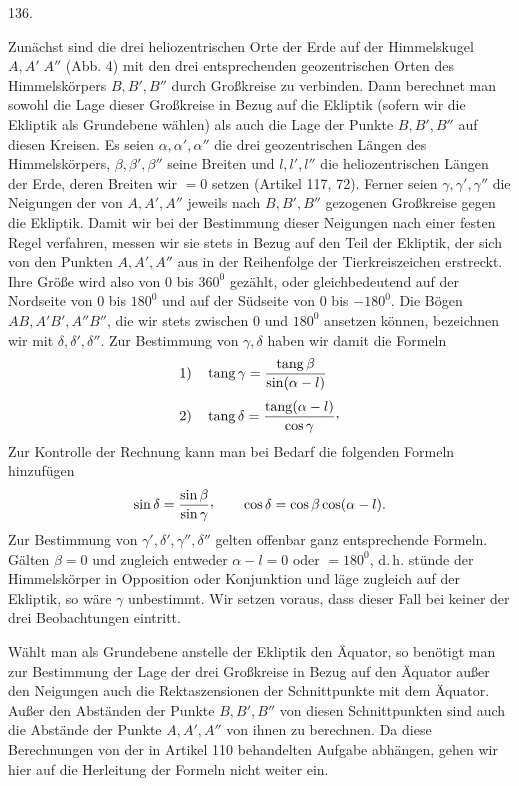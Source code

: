 \par{}\medskip
\begin{center}\hypertarget{native-182-article136}{}136.\end{center}
Zunächst sind die drei heliozentrischen Orte der Erde auf der Himmelskugel $A,A'\;A''$ (Abb. 4) mit
den drei entsprechenden geozentrischen Orten des Himmelskörpers $B,B',B''$ durch Großkreise zu
verbinden. Dann berechnet man sowohl die Lage dieser Großkreise in Bezug auf die Ekliptik
(sofern wir die Ekliptik als Grundebene wählen) als auch die Lage der Punkte $B,B',B''$ auf diesen
Kreisen. Es seien $\alpha,\alpha',\alpha''$ die drei geozentrischen Längen des Himmelskörpers, $\beta,\beta',\beta''$ seine Breiten
und $l,l',l''$ die heliozentrischen Längen der Erde, deren Breiten wir $=0$ setzen (Artikel 117,
72). Ferner seien $\gamma,\gamma',\gamma''$ die Neigungen der von $A,A',A''$ jeweils nach $B,B',B''$ gezogenen Großkreise
gegen die Ekliptik. Damit wir bei der Bestimmung dieser Neigungen nach einer festen Regel
verfahren, messen wir sie stets in Bezug auf den Teil der Ekliptik, der sich von den Punkten
$A,A',A''$ aus in der Reihenfolge der Tierkreiszeichen erstreckt. Ihre Größe wird also von $0$
bis $360^0$ gezählt, oder gleichbedeutend auf der Nordseite von $0$ bis $180^0$ und auf der
Südseite von $0$ bis $-180^0$. Die Bögen $AB,A'B',A''B''$, die wir stets zwischen $0$ und $180^0$
ansetzen können, bezeichnen wir mit $\delta,\delta',\delta''$. Zur Bestimmung von $\gamma,\delta$ haben wir damit die
Formeln
\[
\begin{aligned}
1)\quad&\operatorname{tang}\gamma=\frac{\operatorname{tang}\beta}{\sin(\alpha-l)}\\[.7ex]
2)\quad&\operatorname{tang}\delta=\frac{\operatorname{tang}(\alpha-l)}{\cos\gamma}\mathpunct{\raisebox{.45ex}{,}}
\end{aligned}
\]
Zur Kontrolle der Rechnung kann man bei Bedarf die folgenden Formeln hinzufügen
\[
\sin\delta=\frac{\sin\beta}{\sin\gamma}\mathpunct{\raisebox{.45ex}{,}}\qquad
\cos\delta=\cos\beta\cos(\alpha-l).
\]
Zur Bestimmung von $\gamma',\delta',\gamma'',\delta''$ gelten offenbar ganz entsprechende Formeln. Gälten $\beta=0$ und zugleich
entweder $\alpha-l=0$ oder $=180^0$, d.\,h. stünde der Himmelskörper in Opposition oder Konjunktion und
läge zugleich auf der Ekliptik, so wäre $\gamma$ unbestimmt. Wir setzen voraus, dass dieser Fall
bei keiner der drei Beobachtungen eintritt.

Wählt man als Grundebene anstelle der Ekliptik den Äquator, so benötigt man zur Bestimmung der
Lage der drei Großkreise in Bezug auf den Äquator außer den Neigungen auch die Rektaszensionen
der Schnittpunkte mit dem \hypertarget{native-183}{}Äquator. Außer den Abständen der Punkte $B,B',B''$ von diesen
Schnittpunkten sind auch die Abstände der Punkte $A,A',A''$ von ihnen zu berechnen. Da diese
Berechnungen von der in Artikel 110 behandelten Aufgabe abhängen, gehen wir hier auf die
Herleitung der Formeln nicht weiter ein.
